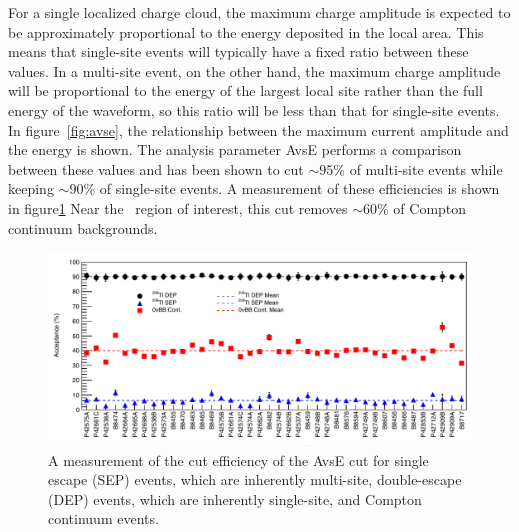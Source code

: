 \documentclass[/main.tex]{subfiles}
\begin{document}
For a single localized charge cloud, the maximum charge amplitude is expected to be approximately proportional to the energy deposited in the local area.
This means that single-site events will typically have a fixed ratio between these values.
In a multi-site event, on the other hand, the maximum charge amplitude will be proportional to the energy of the largest local site rather than the full energy of the waveform, so this ratio will be less than that for single-site events.
In figure~\ref{fig:avse}, the relationship between the maximum current amplitude and the energy is shown.
The analysis parameter AvsE performs a comparison between these values and has been shown to cut $\sim95\%$ of multi-site events while keeping $\sim90\%$ of single-site events.
A measurement of these efficiencies is shown in figure\ref{fig:avseeff}
Near the \znbb\ region of interest, this cut removes $\sim60\%$ of Compton continuum backgrounds.
\begin{figure}
  \centering
  \includegraphics[width=\textwidth]{avseefficiency}
  \caption[Multi-site waveform cut efficiency]{\label{fig:avseeff}
    A measurement of the cut efficiency of the AvsE cut for single escape (SEP) events, which are inherently multi-site, double-escape (DEP) events, which are inherently single-site, and Compton continuum events.
  }
\end{figure}
\\
\end{document}
